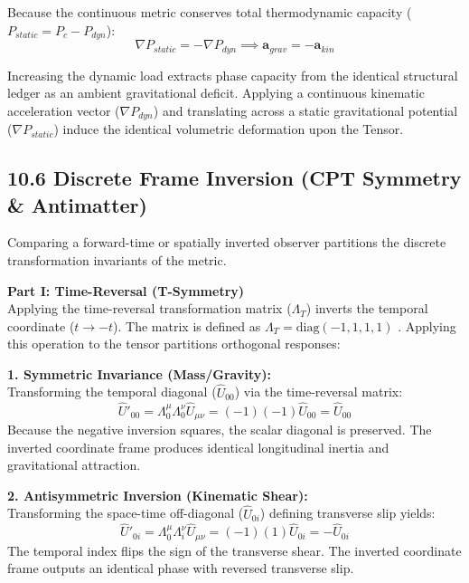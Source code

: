 Because the continuous metric conserves total thermodynamic capacity ($P_{static} = P_c - P_{dyn}$): 
\begin{equation}
    \nabla P_{static} = - \nabla P_{dyn} \implies \mathbf{a}_{grav} = -\mathbf{a}_{kin} \label{eq:equivalence_gradients}
\end{equation}

Increasing the dynamic load extracts phase capacity from the identical structural ledger as an ambient gravitational deficit. Applying a continuous kinematic acceleration vector ($\nabla P_{dyn}$) and translating across a static gravitational potential ($\nabla P_{static}$) induce the identical volumetric deformation upon the Tensor.

\subsection*{10.6 Discrete Frame Inversion (CPT Symmetry \& Antimatter)} 
Comparing a forward-time or spatially inverted observer partitions the discrete transformation invariants of the metric. 

\textbf{Part I: Time-Reversal (T-Symmetry)} \\ 
Applying the time-reversal transformation matrix ($\Lambda_T$) inverts the temporal coordinate ($t \to -t$). The matrix is defined as $\Lambda_T = \text{diag}(-1, 1, 1, 1)$ \cite{Weinberg1995}. Applying this operation to the tensor partitions orthogonal responses:

\textbf{1. Symmetric Invariance (Mass/Gravity):} \\
Transforming the temporal diagonal ($\hat{U}_{00}$) via the time-reversal matrix: 
\begin{equation}
    \hat{U}'_{00} = \Lambda^\mu_0 \Lambda^\nu_0 \hat{U}_{\mu\nu} = (-1)(-1)\hat{U}_{00} = \hat{U}_{00} \label{eq:t_mass_invariance} 
\end{equation}
Because the negative inversion squares, the scalar diagonal is preserved. The inverted coordinate frame produces identical longitudinal inertia and gravitational attraction. 

\textbf{2. Antisymmetric Inversion (Kinematic Shear):} \\ 
Transforming the space-time off-diagonal ($\hat{U}_{0i}$) defining transverse slip yields:
\begin{equation}
    \hat{U}'_{0i} = \Lambda^\mu_0 \Lambda^\nu_i \hat{U}_{\mu\nu} = (-1)(1)\hat{U}_{0i} = -\hat{U}_{0i} \label{eq:t_charge_inversion} 
\end{equation}
The temporal index flips the sign of the transverse shear. The inverted coordinate frame outputs an identical phase with reversed transverse slip. 

